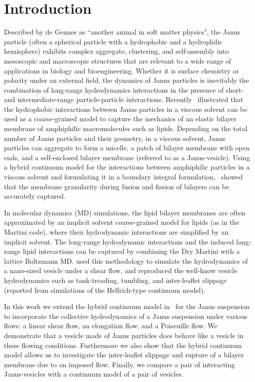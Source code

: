 \documentclass[lineno]{jfm}
\begin{document}
\section{\label{intro}Introduction}
Described by de Gennes as ``another animal in soft matter physics", the
Janus particle (often a spherical particle with a hydrophobic and a
hydrophilic hemisphere) exhibits complex aggregate, clustering, and
self-assembly into mesoscopic and macroscopic structures that are
relevant to a wide range of applications in biology and bioengineering.
Whether it is surface chemistry or polarity under an external field, the
dynamics of Janus particles is inevitably the combination of long-range
hydrodynamics interactions in the presence of short- and
intermediate-range particle-particle interactions. Recently~\cite{Fu20}
illustrated that the hydrophobic interactions between Janus particles in
a viscous solvent can be used as a coarse-grained model to capture the
mechanics of an elastic bilayer membrane of amphiphilic macromolecules
such as lipids. Depending on the total number of Janus particles and
their geometry, in a viscous solvent, Janus particles can aggregate to
form a micelle, a patch of bilayer membrane with open ends, and a
self-enclosed bilayer membrane (referred to as a Janus-vesicle). Using a
hybrid continuum model for the interactions between amphiphilic
particles in a viscous solvent and formulating it in a boundary integral
formulation,~\cite{Fu20} showed that the membrane granularity during
fusion and fission of bilayers can be accurately captured. 

In molecular dynamics (MD) simulations, the lipid bilayer membranes are
often approximated by an implicit solvent coarse-grained model for
lipids (as in the Martini code), where their hydrodynamic interactions
are simplified by an implicit solvent. The long-range hydrodynamic
interactions and the induced long-range lipid interactions can be
captured by combining the Dry Martini with a lattice Boltzmann MD.
\cite{Brandner2019} used this methodology to simulate the hydrodynamics
of a nano-sized vesicle under a shear flow, and reproduced the well-know
vesicle hydrodynamics such as tank-treading, tumbling, and inter-leaflet
slippage (reported from simulations of the Helfrich-type continuum
model).

In this work we extend the hybrid continuum model in~\cite{Fu20} for the
Janus suspension to incorporate the collective hydrodynamics of a Janus
suspension under various flows: a linear shear flow, an elongation flow,
and a Poiseuille flow. We demonstrate that a vesicle made of Janus
particles does behave like a vesicle in these flowing conditions.
Furthermore we also show that the hybrid continuum model allows us to
investigate the inter-leaflet slippage and rupture of a bilayer membrane
due to an imposed flow. Finally, we compare a pair of interacting
Janus-vesicles with a continuum model of a pair of vesicles.
\end{document}
